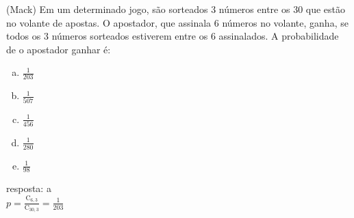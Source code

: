 \begin{ex}
  (Mack) Em um determinado jogo, são sorteados 3 números entre os 30 que estão no volante de apostas. O apostador, que assinala 6 números no volante, ganha, se todos os 3 números sorteados estiverem entre os 6 assinalados. A probabilidade de o apostador ganhar é:
    \begin{enumerate} [(a)]
        \item $\frac{1}{203}$
        \item $\frac{1}{507}$
        \item $\frac{1}{456}$
        \item $\frac{1}{280}$
        \item $\frac{1}{98}$
    \end{enumerate}
     \begin{sol}
     resposta: a \\
     $p=\frac{\mathrm{C}_{6,3}}{\mathrm{C}_{{30},3}}=\frac{1}{203}$
     \end{sol}
 \end{ex}